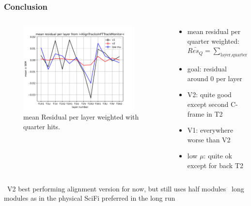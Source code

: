 \documentclass[aspectratio=1610, 12pt]{beamer}
\begin{document}
\begin{frame}\frametitle{Conclusion}
    \begin{columns}
      \begin{column}[c]{0.48\textwidth}
        \begin{figure}
          \centering
          \includegraphics[width=0.9\textwidth]{2023-mar-9-DPG/meanResidual_AlignTracks_weighted.pdf}
          \caption{mean Residual per layer weighted with quarter hits.}
        \end{figure}
      \end{column}
      \begin{column}{0.48\textwidth}
        \begin{itemize}
          \item mean residual per quarter weighted: $
              \bar{Res_{Q}} = \sum_{\text{layer}, \text{quarter}} \frac{\text{hits quarter of layer}}{\text{hits layer}}$
          \item goal: residual around 0 per layer
          \item V2: quite good except second C-frame in T2
          \item V1: everywhere worse than V2
          \item low $\mu$: quite ok except for back T2
        \end{itemize}
      \end{column}
    \end{columns}
  \to\, V2 best performing alignment version for now, but still uses half modules
  \to\, long modules as in the physical SciFi preferred in the long run
\end{frame}
\end{document}
